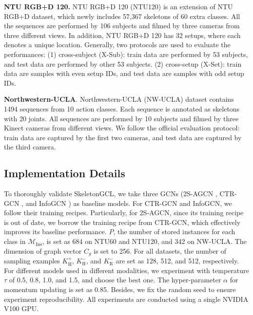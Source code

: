 \documentclass{article} \usepackage{iclr2023_conference,times}
\begin{document}
\textbf{NTU RGB+D 120.} NTU RGB+D 120 (NTU120) \citep{ntu120} is an extension of NTU RGB+D dataset, which newly includes 57,367 skeletons of 60 extra classes. All the sequences are performed by 106 subjects and filmed by three cameras from three different views. In addition, NTU RGB+D 120 has 32 setups, where each denotes a unique location. Generally, two protocols are used to evaluate the performances: (1) cross-subject (X-Sub): train data are performed by 53 subjects, and test data are performed by other 53 subjects. (2) cross-setup (X-Set): train data are samples with even setup IDs, and test data are samples with odd setup IDs.

\textbf{Northwestern-UCLA}. Northwestern-UCLA (NW-UCLA) dataset \citep{nw-ucla} contains 1494 sequences from 10 action classes. Each sequence is annotated as skeletons with 20 joints. All sequences are performed by 10 subjects and filmed by three Kinect cameras from different views. We follow the official evaluation protocol: train data are captured by the first two cameras, and test data are captured by the third camera.

\subsection{Implementation Details}
To thoroughly validate SkeletonGCL, we take three GCNs (2S-AGCN \citep{2SAGCN}, CTR-GCN \citep{CTRGCN}, and InfoGCN \citep{INFOGCN}) as baseline models. For CTR-GCN and InfoGCN, we follow their training recipes. Particularly, for 2S-AGCN, since its training recipe is out of date, we borrow the training recipe from CTR-GCN, which effectively improves its baseline performance. $P$, the number of stored instances for each class in $\mathcal{M}_\text{Ins}$, is set as 684 on NTU60 and NTU120, and 342 on NW-UCLA. The dimension of graph vector $C_g$ is set to 256. For all datasets, the number of sampling examples $K_\text{H}^+$, $K_\text{H}^-$, and $K_\text{R}^-$ are set as 128, 512, and 512, respectively. For different models used in different modalities, we experiment with temperature $\tau$ of 0.5, 0.8, 1.0, and 1.5, and choose the best one. The hyper-parameter $\alpha$ for momentum updating is set as 0.85. Besides, we fix the random seed to ensure experiment reproducibility. All experiments are conducted using a single NVIDIA V100 GPU.
\end{document}
